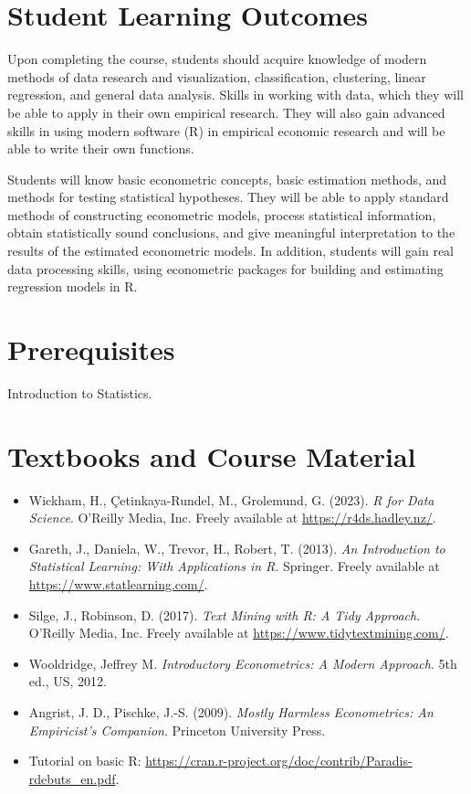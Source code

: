 \documentclass[11pt]{article}
\begin{document}
\section{Student Learning Outcomes}

Upon completing the course, students should acquire knowledge of modern methods of data research and
visualization, classification, clustering, linear regression, and general data analysis. Skills in working
with data, which they will be able to apply in their own empirical research. They will also gain advanced
skills in using modern software (R) in empirical economic research and will be able to write their own
functions.

Students will know basic econometric concepts, basic estimation methods, and methods for testing statistical
hypotheses. They will be able to apply standard methods of constructing econometric models, process
statistical information, obtain statistically sound conclusions, and give meaningful interpretation to the
results of the estimated econometric models. In addition, students will gain real data processing skills,
using econometric packages for building and estimating regression models in R.

\section{Prerequisites}

Introduction to Statistics.

\section{Textbooks and Course Material}

\begin{itemize}
  \item Wickham, H., Çetinkaya-Rundel, M., Grolemund, G. (2023). \textit{R for Data Science}. O'Reilly
        Media, Inc. Freely available at \url{https://r4ds.hadley.nz/}.
  \item Gareth, J., Daniela, W., Trevor, H., Robert, T. (2013). \textit{An Introduction to Statistical
        Learning: With Applications in R}. Springer. Freely available at \url{https://www.statlearning.com/}.
  \item Silge, J., Robinson, D. (2017). \textit{Text Mining with R: A Tidy Approach}. O'Reilly Media, Inc.
        Freely available at \url{https://www.tidytextmining.com/}.
  \item Wooldridge, Jeffrey M. \textit{Introductory Econometrics: A Modern Approach}. 5th ed., US, 2012.
  \item Angrist, J. D., Pischke, J.-S. (2009). \textit{Mostly Harmless Econometrics: An Empiricist's
        Companion}. Princeton University Press.
  \item Tutorial on basic R: \url{https://cran.r-project.org/doc/contrib/Paradis-rdebuts_en.pdf}.
\end{itemize}
\end{document}
